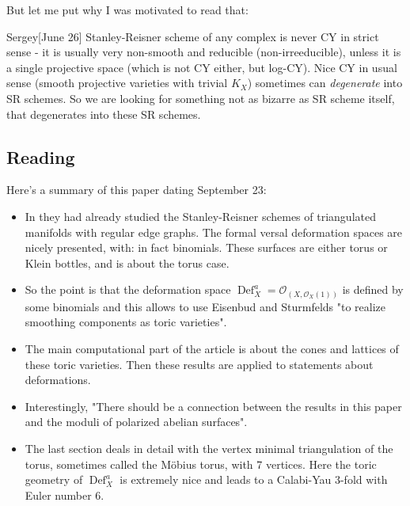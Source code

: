 But let me put why I was motivated to read that:

\begin{thing14}{Sergey}[June 26]\leavevmode
	Stanley-Reisner scheme of any complex is never CY in strict sense - it is usually very non-smooth and reducible (non-irreeducible), unless it is a single projective space (which is not CY either, but log-CY). Nice CY in usual sense (smooth projective varieties with trivial $K_X$) sometimes can \textit{degenerate} into SR schemes. So we are looking for something not as bizarre as SR scheme itself, that degenerates into these SR schemes.
\end{thing14}

\subsection{Reading \cite{jan1}}

Here's a summary of this paper dating September 23:

 \begin{itemize}
\item In \cite{jan2} they had already studied the Stanley-Reisner schemes of triangulated manifolds with regular edge graphs. The formal versal deformation spaces are nicely presented, with: in fact binomials. These surfaces are either torus or Klein bottles, and  \cite{jan1} is about the torus case.

\item So the point is that the deformation space $\operatorname{Def}_{X}^a=\mathcal{O}_{(X, \mathcal{O}_X(1))}$ is defined by some binomials and this allows \cite{jan1} to use Eisenbud and Sturmfelds "to realize smoothing components as toric varieties".

\item The main computational part of the article is about the cones and lattices of these toric varieties. Then these results are applied to statements about deformations.

\item Interestingly, "There should be a connection between the results in this paper and the moduli of polarized abelian surfaces".

\item The last section deals in detail with the vertex minimal triangulation of the torus, sometimes called the Möbius torus, with 7 vertices. Here the toric geometry of $\operatorname{Def}_{X}^a$ is extremely nice and leads to a Calabi-Yau 3-fold with Euler number 6. 
\end{itemize}


